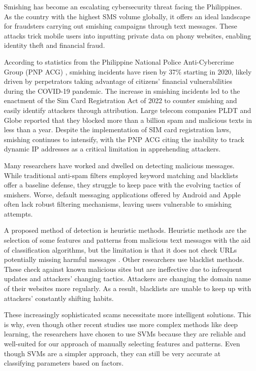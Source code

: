 \documentclass[conference]{IEEEtran}
\begin{document}
Smishing has become an escalating cybersecurity threat facing the Philippines. As the country with the highest SMS volume globally, it offers an ideal landscape for fraudsters carrying out smishing campaigns through text messages. These attacks trick mobile users into inputting private data on phony websites, enabling identity theft and financial fraud.

According to statistics from the Philippine National Police Anti-Cybercrime Group (PNP ACG) \cite{cudis2021}\cite{villanueva2023}, smishing incidents \cite{stojnic2021} have risen by 37\% starting in 2020, likely driven by perpetrators taking advantage of citizens' financial vulnerabilities during the COVID-19 pandemic. The increase in smishing incidents led to the enactment of the Sim Card Registration Act of 2022 to counter smishing and easily identify attackers through attribution. Large telecom companies PLDT and Globe reported that they blocked more than a billion spam and malicious texts in less than a year. \cite{lisette2023} Despite the implementation of SIM card registration laws, smishing continues to intensify, with the PNP ACG citing the inability to track dynamic IP addresses as a critical limitation in apprehending attackers.

Many researchers have worked and dwelled on detecting malicious messages. While traditional anti-spam filters employed keyword matching and blacklists offer a baseline defense, they struggle to keep pace with the evolving tactics of smishers. Worse, default messaging applications offered by Android and Apple often lack robust filtering mechanisms, leaving users vulnerable to smishing attempts. \cite{stojnic2021}

A proposed method of detection is heuristic methods. Heuristic methods are the selection of some features and patterns from malicious text messages with the aid of classification algorithms, but the limitation is that it does not check URLs potentially missing harmful messages \cite{mishra2022}. Other researchers use blacklist methods. These check against known malicious sites but are ineffective due to infrequent updates and attackers' changing tactics. Attackers are changing the domain name of their websites more regularly. As a result, blacklists are unable to keep up with attackers' constantly shifting habits. \cite{mishra2020}

These increasingly sophisticated scams necessitate more intelligent solutions. This is why, even though other recent studies use more complex methods like deep learning, the researchers have chosen to use SVMs because they are reliable and well-suited for our approach of manually selecting features and patterns. Even though SVMs are a simpler approach, they can still be very accurate at classifying parameters based on factors.
\end{document}
